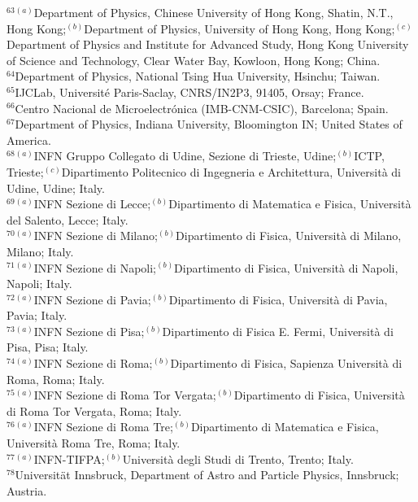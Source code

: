 \begin{flushleft}
$^{63}$$^{(a)}$Department of Physics, Chinese University of Hong Kong, Shatin, N.T., Hong Kong;$^{(b)}$Department of Physics, University of Hong Kong, Hong Kong;$^{(c)}$Department of Physics and Institute for Advanced Study, Hong Kong University of Science and Technology, Clear Water Bay, Kowloon, Hong Kong; China.\\
$^{64}$Department of Physics, National Tsing Hua University, Hsinchu; Taiwan.\\
$^{65}$IJCLab, Universit\'e Paris-Saclay, CNRS/IN2P3, 91405, Orsay; France.\\
$^{66}$Centro Nacional de Microelectrónica (IMB-CNM-CSIC), Barcelona; Spain.\\
$^{67}$Department of Physics, Indiana University, Bloomington IN; United States of America.\\
$^{68}$$^{(a)}$INFN Gruppo Collegato di Udine, Sezione di Trieste, Udine;$^{(b)}$ICTP, Trieste;$^{(c)}$Dipartimento Politecnico di Ingegneria e Architettura, Universit\`a di Udine, Udine; Italy.\\
$^{69}$$^{(a)}$INFN Sezione di Lecce;$^{(b)}$Dipartimento di Matematica e Fisica, Universit\`a del Salento, Lecce; Italy.\\
$^{70}$$^{(a)}$INFN Sezione di Milano;$^{(b)}$Dipartimento di Fisica, Universit\`a di Milano, Milano; Italy.\\
$^{71}$$^{(a)}$INFN Sezione di Napoli;$^{(b)}$Dipartimento di Fisica, Universit\`a di Napoli, Napoli; Italy.\\
$^{72}$$^{(a)}$INFN Sezione di Pavia;$^{(b)}$Dipartimento di Fisica, Universit\`a di Pavia, Pavia; Italy.\\
$^{73}$$^{(a)}$INFN Sezione di Pisa;$^{(b)}$Dipartimento di Fisica E. Fermi, Universit\`a di Pisa, Pisa; Italy.\\
$^{74}$$^{(a)}$INFN Sezione di Roma;$^{(b)}$Dipartimento di Fisica, Sapienza Universit\`a di Roma, Roma; Italy.\\
$^{75}$$^{(a)}$INFN Sezione di Roma Tor Vergata;$^{(b)}$Dipartimento di Fisica, Universit\`a di Roma Tor Vergata, Roma; Italy.\\
$^{76}$$^{(a)}$INFN Sezione di Roma Tre;$^{(b)}$Dipartimento di Matematica e Fisica, Universit\`a Roma Tre, Roma; Italy.\\
$^{77}$$^{(a)}$INFN-TIFPA;$^{(b)}$Universit\`a degli Studi di Trento, Trento; Italy.\\
$^{78}$Universit\"{a}t Innsbruck, Department of Astro and Particle Physics, Innsbruck; Austria.\\
$$
\end{flushleft}
